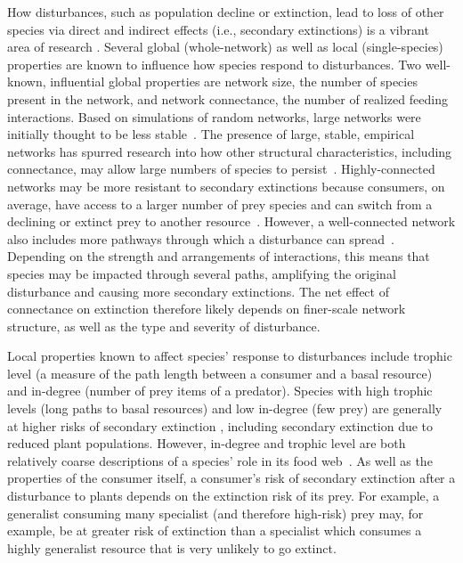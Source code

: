 \documentclass[12pt]{article}
\begin{document}
\begin{spacing}{2.0}
    How disturbances, such as population decline or extinction, lead to loss of other species via direct and indirect effects (i.e., secondary extinctions) is a vibrant area of research \citep{Santos2021,curtsdotter2011robustness, dunne2009cascading, Eklof2006}.
    Several global (whole-network) as well as local (single-species) properties are known to influence how species respond to disturbances. Two well-known, influential global properties are network size, the number of species present in the network, and network connectance, the number of realized feeding interactions.
    Based on simulations of random networks, large networks were initially thought to be less stable~\citep{May1972}.
    The presence of large, stable, empirical networks has spurred research into how other structural characteristics, including connectance, may allow large numbers of species to persist~\citep{Dunne2002}.
    Highly-connected networks may be more resistant to secondary extinctions because consumers, on average, have access to a larger number of prey species and can switch from a declining or extinct prey to another resource~\citep{Dunne2002, Eklof2006,Baumgartner2015}. However, a well-connected network also includes more pathways through which a disturbance can spread~\citep{Dunne2004,Vieira2015}.
    Depending on the strength and arrangements of interactions, this means that species may be impacted through several paths, amplifying the original disturbance and causing more secondary extinctions.
    The net effect of connectance on extinction therefore likely depends on finer-scale network structure, as well as the type and severity of disturbance.
    
    
    Local properties known to affect species' response to disturbances include trophic level (a measure of the path length between a consumer and a basal resource) and in-degree (number of prey items of a predator). 
    Species with high trophic levels (long paths to basal resources) and low in-degree (few prey) are generally at higher risks of secondary extinction \citep{binzer2011susceptibility, Eklof2006}, including secondary extinction due to reduced plant populations.
    However, in-degree and trophic level are both relatively coarse descriptions of a species' role in its food web~\citep{Cirtwill2018FoodWebs}. 
    As well as the properties of the consumer itself, a consumer's risk of secondary extinction after a disturbance to plants depends on the extinction risk of its prey.
    For example, a generalist consuming many specialist (and therefore high-risk) prey may, for example, be at greater risk of extinction than a specialist which consumes a highly generalist resource that is very unlikely to go extinct. 



\end{spacing}
\end{document}
